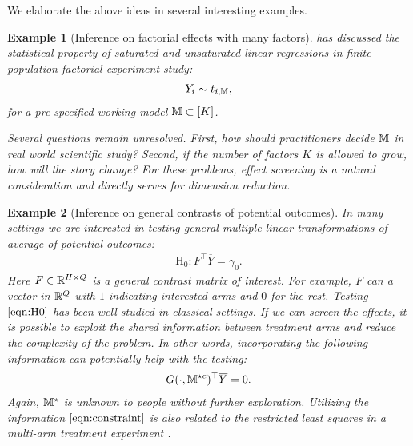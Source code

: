 \documentclass[12pt]{article}
\newtheorem{example}{Example}
\begin{document}
We elaborate the above ideas in several interesting examples.

\begin{example}[Inference on factorial effects with many factors]\label{exp:report-effects}
\cite{zhao2021regression} has discussed the statistical property of saturated and unsaturated linear regressions in finite population factorial experiment study:
\begin{align*}
    Y_i \sim t_{i,{\mathbb{M}}}, 
\end{align*}
for a pre-specified working model ${\mathbb{M}} \subset [K]$. 

Several questions remain unresolved. First, how should practitioners decide ${\mathbb{M}}$ in real world scientific study? Second, if the number of factors $K$ is allowed to grow, how will the story change? For these problems, effect screening is a natural consideration and directly serves for dimension reduction.
\end{example}


\begin{example}[Inference on general contrasts of potential outcomes]\label{exp:general-contrasts}
In many settings we are interested in testing general multiple linear transformations of average of potential outcomes:
\begin{align}
    \text{H}_0: F^\top \overline{Y} = \gamma_0. \label{eqn:H0}
\end{align}
Here $F\in{\mathbb{R}}^{H\times Q}$ is a general contrast matrix of interest. For example, $F$ can a vector in ${\mathbb{R}}^Q$ with $1$ indicating interested arms and $0$ for the rest. Testing $\eqref{eqn:H0}$ has been well studied in classical settings.   If we can screen the effects, it is possible to exploit the shared information between treatment arms and reduce the complexity of the problem. In other words, incorporating the following information can potentially help with the testing:
\begin{align}
 G(\cdot,{{\mathbb{M}}^{\star c}})^\top \overline{Y} = 0. \label{eqn:constraint}
\end{align}
Again, ${\mathbb{M}}^\star$ is unknown to people without further exploration.  Utilizing the information $\eqref{eqn:constraint}$ is also related to the restricted least squares in a multi-arm treatment experiment \citep{zhao2021covariate}. \end{example}
\end{document}
